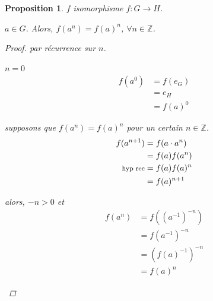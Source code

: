 \documentclass{report}
\newcommand*{\gte}{\geqslant}
\newcommand*{\entiers}{\mathbb{Z}}
\newtheorem*{prop}{Proposition}
\theoremstyle{definition}
\theoremstyle{remark}
\begin{document}
	
	\begin{prop}
		$f$ isomorphisme $f:G \to H$.

		$a \in G$. Alors, $f(a^n)=f(a)^n$, $\forall n \in \entiers$.
		\begin{proof}
			par r\'ecurrence sur $n$.

			\begin{ulist}
				\item[$n\gte 0$]
				\begin{nlist}
					\item $n=0$
					\begin{align*}
						f(a^0)&= f(e_G)\\
						&= e_H\\
						&= f(a)^0
					\end{align*}
					\item supposons que $f(a^n)=f(a)^n$ pour un certain $n \in \entiers$.
					\begin{align*}
						f(a^{n+1})&= f(a \cdot a^n)\\
						&= f(a)f(a^n)\\
						\text{\footnotesize hyp rec}&= f(a)f(a)^n\\
						&= f(a)^{n+1}
					\end{align*}
				\end{nlist}
				\item[$n<0$] alors, $-n>0$ et
				\begin{align*}
					f(a^n)&= f((a^{-1})^{-n})\\
					&= f(a^{-1})^{-n}\\
					&= (f(a)^{-1})^{-n}\\
					&= f(a)^n
				\end{align*}
			\end{ulist}
		\end{proof}
	\end{prop}
\end{document}
